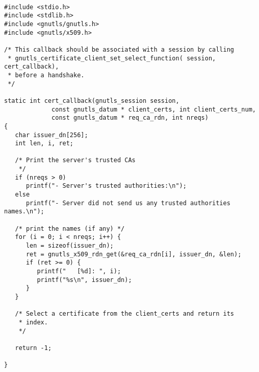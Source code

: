 \begin{verbatim}

#include <stdio.h>
#include <stdlib.h>
#include <gnutls/gnutls.h>
#include <gnutls/x509.h>

/* This callback should be associated with a session by calling
 * gnutls_certificate_client_set_select_function( session, cert_callback),
 * before a handshake.
 */

static int cert_callback(gnutls_session session,
			 const gnutls_datum * client_certs, int client_certs_num,
			 const gnutls_datum * req_ca_rdn, int nreqs)
{
   char issuer_dn[256];
   int len, i, ret;

   /* Print the server's trusted CAs
    */
   if (nreqs > 0)
      printf("- Server's trusted authorities:\n");
   else
      printf("- Server did not send us any trusted authorities names.\n");

   /* print the names (if any) */
   for (i = 0; i < nreqs; i++) {
      len = sizeof(issuer_dn);
      ret = gnutls_x509_rdn_get(&req_ca_rdn[i], issuer_dn, &len);
      if (ret >= 0) {
         printf("   [%d]: ", i);
         printf("%s\n", issuer_dn);
      }
   }

   /* Select a certificate from the client_certs and return its
    * index.
    */

   return -1;

}

\end{verbatim}
